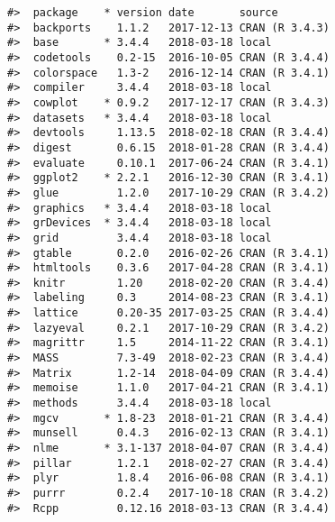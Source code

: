 \documentclass[12pt,]{article}
\begin{document}
\begin{verbatim}
#>  package    * version date       source                                  
#>  backports    1.1.2   2017-12-13 CRAN (R 3.4.3)                          
#>  base       * 3.4.4   2018-03-18 local                                   
#>  codetools    0.2-15  2016-10-05 CRAN (R 3.4.4)                          
#>  colorspace   1.3-2   2016-12-14 CRAN (R 3.4.1)                          
#>  compiler     3.4.4   2018-03-18 local                                   
#>  cowplot    * 0.9.2   2017-12-17 CRAN (R 3.4.3)                          
#>  datasets   * 3.4.4   2018-03-18 local                                   
#>  devtools     1.13.5  2018-02-18 CRAN (R 3.4.4)                          
#>  digest       0.6.15  2018-01-28 CRAN (R 3.4.4)                          
#>  evaluate     0.10.1  2017-06-24 CRAN (R 3.4.1)                          
#>  ggplot2    * 2.2.1   2016-12-30 CRAN (R 3.4.1)                          
#>  glue         1.2.0   2017-10-29 CRAN (R 3.4.2)                          
#>  graphics   * 3.4.4   2018-03-18 local                                   
#>  grDevices  * 3.4.4   2018-03-18 local                                   
#>  grid         3.4.4   2018-03-18 local                                   
#>  gtable       0.2.0   2016-02-26 CRAN (R 3.4.1)                          
#>  htmltools    0.3.6   2017-04-28 CRAN (R 3.4.1)                          
#>  knitr        1.20    2018-02-20 CRAN (R 3.4.4)                          
#>  labeling     0.3     2014-08-23 CRAN (R 3.4.1)                          
#>  lattice      0.20-35 2017-03-25 CRAN (R 3.4.4)                          
#>  lazyeval     0.2.1   2017-10-29 CRAN (R 3.4.2)                          
#>  magrittr     1.5     2014-11-22 CRAN (R 3.4.1)                          
#>  MASS         7.3-49  2018-02-23 CRAN (R 3.4.4)                          
#>  Matrix       1.2-14  2018-04-09 CRAN (R 3.4.4)                          
#>  memoise      1.1.0   2017-04-21 CRAN (R 3.4.1)                          
#>  methods      3.4.4   2018-03-18 local                                   
#>  mgcv       * 1.8-23  2018-01-21 CRAN (R 3.4.4)                          
#>  munsell      0.4.3   2016-02-13 CRAN (R 3.4.1)                          
#>  nlme       * 3.1-137 2018-04-07 CRAN (R 3.4.4)                          
#>  pillar       1.2.1   2018-02-27 CRAN (R 3.4.4)                          
#>  plyr         1.8.4   2016-06-08 CRAN (R 3.4.1)                          
#>  purrr        0.2.4   2017-10-18 CRAN (R 3.4.2)                          
#>  Rcpp         0.12.16 2018-03-13 CRAN (R 3.4.4)                          

\end{verbatim}
\end{document}
